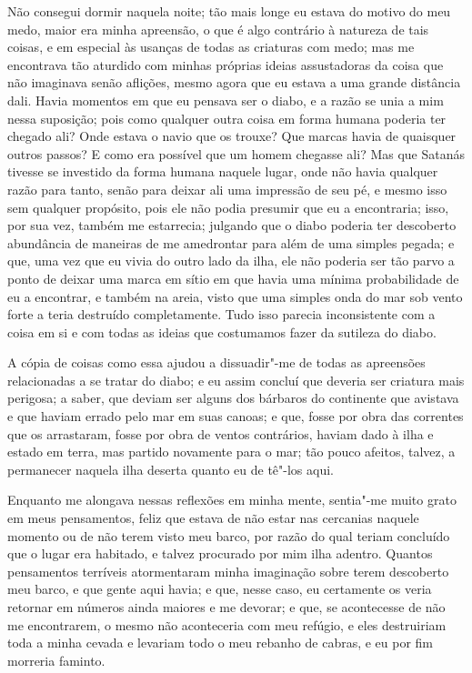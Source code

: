 Não consegui dormir naquela noite; tão mais longe eu estava do motivo do
meu medo, maior era minha apreensão, o que é algo contrário à natureza
de tais coisas, e em especial às usanças de todas as criaturas com medo;
mas me encontrava tão aturdido com minhas próprias ideias assustadoras
da coisa que não imaginava senão aflições, mesmo agora que eu estava a
uma grande distância dali. Havia momentos em que eu pensava ser o diabo,
e a razão se unia a mim nessa suposição; pois como qualquer outra coisa
em forma humana poderia ter chegado ali? Onde estava o navio que os
trouxe? Que marcas havia de quaisquer outros passos? E como era possível
que um homem chegasse ali? Mas que Satanás tivesse se investido da forma
humana naquele lugar, onde não havia qualquer razão para tanto, senão
para deixar ali uma impressão de seu pé, e mesmo isso sem qualquer
propósito, pois ele não podia presumir que eu a encontraria; isso, por
sua vez, também me estarrecia; julgando que o diabo poderia ter
descoberto abundância de maneiras de me amedrontar para além de uma
simples pegada; e que, uma vez que eu vivia do outro lado da ilha, ele
não poderia ser tão parvo a ponto de deixar uma marca em sítio em que
havia uma mínima probabilidade de eu a encontrar, e também na areia,
visto que uma simples onda do mar sob vento forte a teria destruído
completamente. Tudo isso parecia inconsistente com a coisa em si e com
todas as ideias que costumamos fazer da sutileza do diabo.

A cópia de coisas como essa ajudou a dissuadir"-me de todas as apreensões
relacionadas a se tratar do diabo; e eu assim concluí que deveria ser
criatura mais perigosa; a saber, que deviam ser alguns dos bárbaros do
continente que avistava e que haviam errado pelo mar em suas canoas; e
que, fosse por obra das correntes que os arrastaram, fosse por obra de
ventos contrários, haviam dado à ilha e estado em terra, mas partido
novamente para o mar; tão pouco afeitos, talvez, a permanecer naquela
ilha deserta quanto eu de tê"-los aqui.

Enquanto me alongava nessas reflexões em minha mente, sentia"-me muito
grato em meus pensamentos, feliz que estava de não estar nas cercanias
naquele momento ou de não terem visto meu barco, por razão do qual
teriam concluído que o lugar era habitado, e talvez procurado por mim
ilha adentro. Quantos pensamentos terríveis atormentaram minha
imaginação sobre terem descoberto meu barco, e que gente aqui havia; e
que, nesse caso, eu certamente os veria retornar em números ainda
maiores e me devorar; e que, se acontecesse de não me encontrarem, o
mesmo não aconteceria com meu refúgio, e eles destruiriam toda a minha
cevada e levariam todo o meu rebanho de cabras, e eu por fim morreria
faminto.


